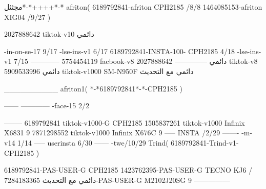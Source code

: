 مجثثل*-*++++*-*
afriton(
6189792841-afriton CPH2185  /8/8
1464085153-afriton XIG04  /9/27
)

2027888642 tiktok-v10
دائمي

-in-on-se-17 9/17
-lse-ins-v1 6/17
6189792841-INSTA-100- CPH2185 4/18
-lse-ins-v1 7/15
------------
5754454119 facbook-v8
دائمي
--------------
2027888642 tiktok-v8
دائمي
5909533996 tiktok-v1000  SM-N950F
دائمي مع التحديث

__________
afriton1(
*-*6189792841*-*-CPH2185
)


------
------------
-face-15 2/2

--------
6189792841 tiktok-v1000-G CPH2185 
1505837261 tiktok-v1000 Infinix X6831 9
7871298552 tiktok-v1000 Infinix X676C 9
-----
 INSTA /2/29
-------
-m-v14 1/14
-----
userinsta 6/30
------
-twe/10/29
Trind(
6189792841-Trind-v1- CPH2185 
)


6189792841-PAS-USER-G CPH2185 
1423762395-PAS-USER-G TECNO KJ6  /دائمي مع التحديث
7284183365-PAS-USER-G   M2102J20SG   9
    ---------------
